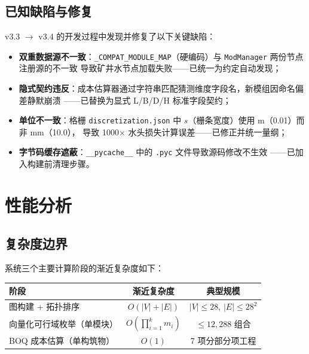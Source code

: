 \documentclass[12pt,a4paper]{ctexart}
\theoremstyle{definition}
\theoremstyle{remark}
\begin{document}
\subsection{已知缺陷与修复}

v3.3 $\to$ v3.4 的开发过程中发现并修复了以下关键缺陷：
\begin{itemize}
  \item \textbf{双重数据源不一致}：\texttt{\_COMPAT\_MODULE\_MAP}（硬编码）与 \texttt{ModManager} 两份节点注册源的不一致
        导致矿井水节点加载失败——已统一为约定自动发现；
  \item \textbf{隐式契约违反}：成本估算器通过字符串匹配猜测维度字段名，新模组因命名偏差静默崩溃
        ——已替换为显式 L/B/D/H 标准字段契约；
  \item \textbf{单位不一致}：格栅 \texttt{discretization.json} 中 $s$（栅条宽度）使用 m（0.01）而非 mm（10.0），
        导致 1000$\times$ 水头损失计算误差——已修正并统一量纲；
  \item \textbf{字节码缓存遮蔽}：\texttt{\_\_pycache\_\_} 中的 \texttt{.pyc} 文件导致源码修改不生效
        ——已加入构建前清理步骤。
\end{itemize}

\section{性能分析}\label{sec:performance}

\subsection{复杂度边界}

系统三个主要计算阶段的渐近复杂度如下：

\begin{center}
\begin{tabular}{lcc}
\toprule
\textbf{阶段} & \textbf{渐近复杂度} & \textbf{典型规模} \\
\midrule
图构建 + 拓扑排序                     & $O(|V| + |E|)$          & $|V| \le 28$, $|E| \le 28^2$ \\
向量化可行域枚举（单模块）            & $O(\prod_{i=1}^k m_i)$  & $\le 12,288$ 组合 \\
BOQ 成本估算（单构筑物）              & $O(1)$                  & 7 项分部分项工程 \\
\bottomrule
\end{tabular}
\end{center}
\end{document}
